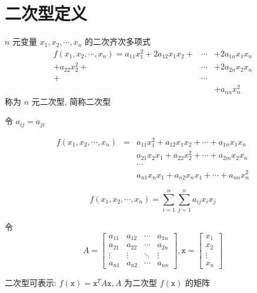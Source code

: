 \section{二次型定义}
\begin{definition}[二次型]
	$n$ 元变量 $x_{1},x_{2},\cdots,x_{n}$ 的二次齐次多项式
	\begin{eqnarray*}
		f(x_{1},x_{2},\cdots,x_{n}) = a_{11}x_{1}^{2} + 2a_{12}x_{1}x_{2} + & \cdots & + 2a_{1n}x_{1}x_{n}\\
		                                              + a_{22}x_{2}^2     + & \cdots & + 2a_{2n}x_{2}x_{n}\\
		                                                                  + & \cdots &                    \\
		                                                                    &        & + a_{nn}x_{n}^{2}
	\end{eqnarray*}
	称为 $n$ 元二次型, 简称二次型
	
	令 $a_{ij}=a_{ji}$

	\begin{eqnarray*}
		f(x_{1},x_{2},\cdots,x_{n}) & = & a_{11}x_{1}^{2}  + a_{12}x_{1}x_{2} + \cdots + a_{1n}x_{1}x_{n} \\
		                            &   & a_{21}x_{2}x_{1} + a_{22}x_{2}^2    + \cdots + a_{2m}x_{2}x_{n} \\
		                            &   & \cdots                                                          \\
		                            &   & a_{n1}x_{n}x_{1} + a_{n2}x_{n}x_{1} + \cdots + a_{nn}x_{n}^{2}
	\end{eqnarray*}
	
	$$f(x_{1},x_{2},\cdots,x_{n}) = \sum\limits_{i=1}^{n}\sum\limits_{j=1}^{n}a_{ij}x_{i}x_{j}$$
	
	令 $$ A =
	\begin{bmatrix}
		a_{11} & a_{12} & \cdots & a_{1n}\\
		a_{21} & a_{22} & \cdots & a_{2n}\\
		\vdots & \vdots & \ddots & \vdots\\
		a_{n1} & a_{n2} & \cdots & a_{nn}
	\end{bmatrix}, 
	\mathtt{x} = 
	\begin{bmatrix}
	x_{1}\\x_{2}\\\vdots\\x_{n}
	\end{bmatrix}$$

	二次型可表示: $f(\mathtt{x}) = \mathtt{x}^{T}A\mathtt{x}, A$ 为二次型 $f(\mathtt{x})$ 的矩阵
\end{definition}


